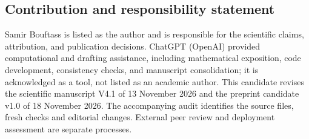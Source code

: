 \documentclass[
  10pt,
  a4paper,
]{article}
\begin{document}
\subsection{Contribution and responsibility
statement}\label{contribution-and-responsibility-statement}

Samir Bouftass is listed as the author and is responsible for the
scientific claims, attribution, and publication decisions. ChatGPT
(OpenAI) provided computational and drafting assistance, including
mathematical exposition, code development, consistency checks, and
manuscript consolidation; it is acknowledged as a tool, not listed as an
academic author. This candidate revises the scientific manuscript V4.1
of 13 November 2026 and the preprint candidate v1.0 of 18 November 2026.
The accompanying audit identifies the source files, fresh checks and
editorial changes. External peer review and deployment assessment are
separate processes.
\end{document}

